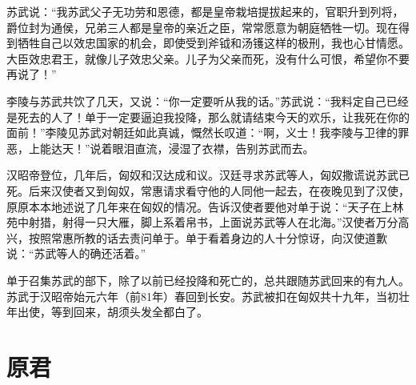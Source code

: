 \documentclass[12pt,UTF-8,openany,a4]{ctexbook}
\begin{document}
\begin{large}
    苏武说：“我苏武父子无功劳和恩德，都是皇帝栽培提拔起来的，官职升到列将，爵位封为通侯，兄弟三人都是皇帝的亲近之臣，常常愿意为朝庭牺牲一切。现在得到牺牲自己以效忠国家的机会，即使受到斧钺和汤镬这样的极刑，我也心甘情愿。大臣效忠君王，就像儿子效忠父亲。儿子为父亲而死，没有什么可恨，希望你不要再说了！”
    
    李陵与苏武共饮了几天，又说：“你一定要听从我的话。”苏武说：“我料定自己已经是死去的人了！单于一定要逼迫我投降，那么就请结束今天的欢乐，让我死在你的面前！”李陵见苏武对朝廷如此真诚，慨然长叹道：“啊，义士！我李陵与卫律的罪恶，上能达天！”说着眼泪直流，浸湿了衣襟，告别苏武而去。
    
    汉昭帝登位，几年后，匈奴和汉达成和议。汉廷寻求苏武等人，匈奴撒谎说苏武已死。后来汉使者又到匈奴，常惠请求看守他的人同他一起去，在夜晚见到了汉使，原原本本地述说了几年来在匈奴的情况。告诉汉使者要他对单于说：“天子在上林苑中射猎，射得一只大雁，脚上系着帛书，上面说苏武等人在北海。”汉使者万分高兴，按照常惠所教的话去责问单于。单于看着身边的人十分惊讶，向汉使道歉说：“苏武等人的确还活着。”
    
    单于召集苏武的部下，除了以前已经投降和死亡的，总共跟随苏武回来的有九人。苏武于汉昭帝始元六年（前81年）春回到长安。苏武被扣在匈奴共十九年，当初壮年出使，等到回来，胡须头发全都白了。
    

\end{large}



\chapter{原君}
\end{document}
